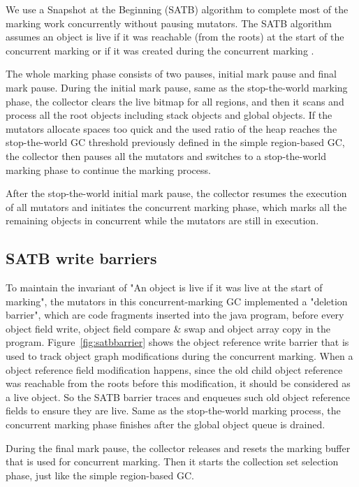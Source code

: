We use a Snapshot at the Beginning (SATB) algorithm \cite{yuasa1990real} to
complete most of the marking work concurrently without pausing mutators. The SATB algorithm assumes an object is live if it was reachable (from the roots)
at the start of the concurrent marking or if it was created during the concurrent marking \cite{yuasa1990real}.

The whole marking phase consists of two pauses, initial mark pause and final mark pause.
During the initial mark pause, same as the stop-the-world marking phase,
the collector clears the live bitmap for all regions,
and then it scans and process all the root objects including stack objects and global objects.
If the mutators allocate spaces too quick and the used ratio of the heap reaches
the stop-the-world GC threshold previously defined in the simple region-based GC, the
collector then pauses all the mutators and switches to a stop-the-world marking phase
to continue the marking process.

After the stop-the-world initial mark pause, the collector resumes the execution of all mutators and
initiates the concurrent marking phase, which marks all the remaining objects in concurrent
while the mutators are still in execution.

\subsection{SATB write barriers}

To maintain the invariant of "An object is live if it was live at the start of marking",
the mutators in this concurrent-marking GC implemented a "deletion barrier", which are code
fragments inserted into the java program, before every object field write, object field compare \& swap
and object array copy in the program. Figure~\ref{fig:satbbarrier} shows the object reference write barrier that is used
to track object graph modifications during the concurrent marking.
When a object reference field modification happens, since the old child object reference
was reachable from the roots before this modification, it should be considered as a live object.
So the SATB barrier traces and enqueues such old object reference fields to ensure they are live.
Same as the stop-the-world marking process, the concurrent marking phase finishes after
the global object queue is drained.

During the final mark pause, the collector releases and resets the marking buffer that
is used for concurrent marking. Then it starts the collection set selection phase, just like the
simple region-based GC.
\\\\

